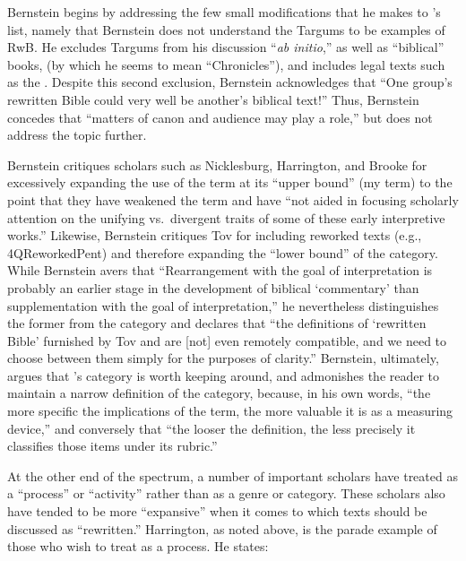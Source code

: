 Bernstein begins by addressing the few small modifications that he makes to \vermes's list, namely that Bernstein does not understand the Targums to be examples of RwB. He excludes Targums from his discussion ``\emph{ab initio},'' as well as ``biblical'' books, (by which he seems to mean ``Chronicles''), and includes legal texts such as the \templescroll. Despite this second exclusion, Bernstein acknowledges that ``One group's rewritten Bible could very well be another's biblical text!'' \autocite[175. This seems particularly odd, since, and Ethiopian Christian may protest that \jub should be excluded as well.]{bernstein_textus2005} Thus, Bernstein concedes that ``matters of canon and audience may play a role,'' but does not address the topic further. 

Bernstein critiques scholars such as Nicklesburg,\autocite{nickelsburg_stone1984} Harrington,\autocite{harrington_kraft-nickelsburg1986} and Brooke\autocite{brooke_schiffman-vanderkam2000} for excessively expanding the use of the term \rwb at its ``upper bound'' (my term) to the point that they have weakened the term and have ``not aided in focusing scholarly attention on the unifying vs.~divergent traits of some of these early interpretive works.''\autocite[179]{bernstein_textus2005} Likewise, Bernstein critiques Tov for including reworked texts (e.g., 4QReworkedPent) and therefore expanding the ``lower bound'' of the category. While Bernstein avers that ``Rearrangement with the goal of interpretation is probably an earlier stage in the development of biblical `commentary' than supplementation with the goal of interpretation,''\autocite[PAGE]{bernstein_textus2005} he nevertheless distinguishes the former from the category \rwb and declares that ``the definitions of `rewritten Bible' furnished by Tov and \vermes are {[}not{]} even remotely compatible, and we need to choose between them simply for the purposes of clarity.''\autocite[185]{bernstein_textus2005} Bernstein, ultimately, argues that \vermes's category is worth keeping around, and admonishes the reader to maintain a narrow definition of the category, because, in his own words, ``the more specific the implications of the term, the more valuable it is as a measuring device,''\autocite[195]{bernstein_textus2005} and conversely that ``the looser the definition, the less precisely it classifies those items under its rubric.'' \autocite[195]{bernstein_textus2005} 

At the other end of the spectrum, a number of important scholars have treated \rwb as a ``process'' or ``activity'' rather than as a genre or category. These scholars also have tended to be more ``expansive'' when it comes to which texts should be discussed as ``rewritten.'' Harrington, as noted above, is the parade example of those who wish to treat \rwb as a process. He states: 

